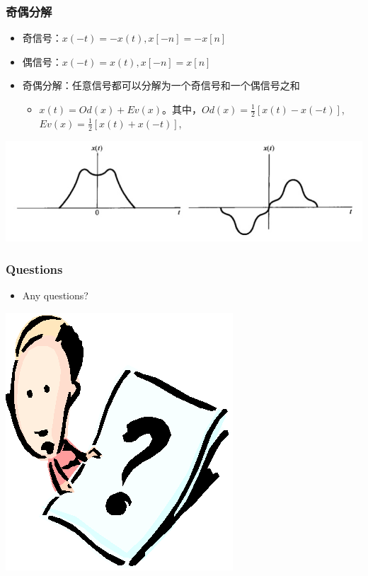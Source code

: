 \documentclass[CJKutf8,dvipsnames,table]{beamer}
\begin{document}
\begin{CJK*}{UTF8}{song}
  \begin{frame}
    \frametitle{奇偶分解}
    \begin{itemize}
    \item 奇信号：$x(-t)=-x(t), x[-n]=-x[n]$
    \item 偶信号：$x(-t)=x(t), x[-n]=x[n]$
    \item 奇偶分解：任意信号都可以分解为一个奇信号和一个偶信号之和
    \begin{itemize}
    \item $x(t)=Od(x)+Ev(x)$。其中，$Od(x)=\frac{1}{2}[x(t)-x(-t)]$, $Ev(x)=\frac{1}{2}[x(t)+x(-t)]$,
    \end{itemize}
    \end{itemize}
    \begin{center}
      \includegraphics[scale=.4]{odev}
    \end{center}       
  \end{frame}  
  
  \begin{frame}
    \frametitle{Questions}
    \begin{itemize}
    \item Any questions?
    \end{itemize}
    \begin{center}
      \includegraphics[scale=.5]{question}
    \end{center}
  \end{frame}


\end{CJK*}
\end{document}
